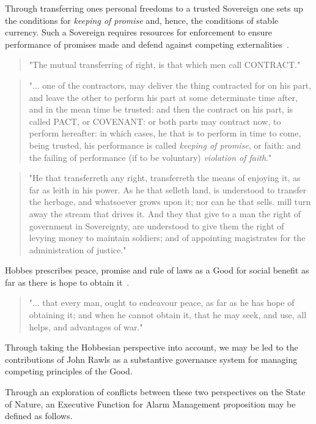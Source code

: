 \documentclass[11pt, oneside]{book}   	%
\begin{document}
Through transferring ones personal freedoms to a trusted Sovereign one sets up the conditions for \emph{keeping of promise} and, hence, the conditions of stable currency. Such a Sovereign requires resources for enforcement to ensure performance of promises made and defend against competing externalities~\cite{th1}.

\begin{quote}
"The mutual transferring of right, is that which men call CONTRACT."
\end{quote}
\begin{quote}
"... one of the contractors, may deliver the thing contracted for on his part, and leave the other to perform his part at some determinate time after, and in the mean time be trusted: and then the contract on his part, is called PACT, or COVENANT: or both parts may contract now, to perform hereafter: in which cases, he that is to perform in time to come, being trusted, his performance is called \emph{keeping of promise}, or faith: and the failing of performance (if to be voluntary) \emph{violation of faith}."
\end{quote}
\begin{quote}
"He that transferreth any right, transferreth the means of enjoying it, as far as leith in his power. As he that selleth land, is understood to transfer the herbage, and whatsoever grows upon it; nor can he that sells. mill turn away the stream that drives it. And they that give to a man the right of government in Sovereignty, are understood to give them the right of levying money to maintain soldiers; and of appointing magistrates for the administration of justice."
\end{quote}

Hobbes prescribes peace, promise and rule of laws as a Good for social benefit as far as there is hope to obtain it~\cite{th1}.

\begin{quote}
"... that every man, ought to endeavour peace, as far as he has hope of obtaining it; and when he cannot obtain it, that he may seek, and use, all helps, and advantages of war."
\end{quote}
Through taking the Hobbesian perspective into account, we may be led to the contributions of John Rawls as a substantive governance system for managing competing principles of the Good.\

Through an exploration of conflicts between these two perspectives on the State of Nature, an Executive Function for Alarm Management proposition may be defined as follows.\
\end{document}
